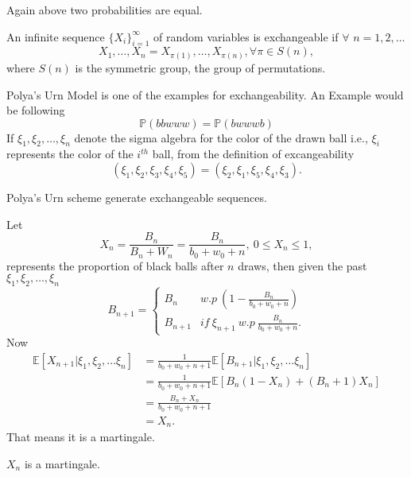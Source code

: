 \documentclass[a4paper,english,12pt]{article}
\begin{document}
Again above two probabilities are equal.
\begin{defn}
An infinite sequence $\{X_i\}_{i=1}^{\infty}$ of random variables is exchangeable if $\forall$ $n=1,2,\dots$
 \begin{equation*}
X_1,\dots,X_n=X_{\pi(1)},\dots ,X_{\pi(n)}, \forall \pi \in S(n),
\end{equation*}
where $S(n)$ is the symmetric group, the group of permutations.
\end{defn}
Polya's Urn Model is one of the examples for exchangeability. An Example would be following
 \begin{equation*}
\mathbb{P}(bbwww)=\mathbb{P}(bwwwb)
\end{equation*}
If $\xi_1,\xi_2,\dots,\xi_n$ denote the sigma algebra for the color of the drawn ball i.e., $\xi_i$ represents the color of the $i^{th}$ ball, from the definition of excangeability
\begin{equation*}
(\xi_1,\xi_2,\xi_3,\xi_4,\xi_5)=(\xi_2,\xi_1,\xi_5,\xi_4,\xi_3).
\end{equation*}
\begin{note}
Polya's Urn scheme generate exchangeable sequences.
\end{note}
Let 
\begin{equation*}
X_n=\frac{B_n}{B_n+W_n}=\frac{B_n}{b_0+w_0+n},\ 0\leq X_n \leq1,
\end{equation*}
represents the proportion of black balls after $n$ draws, then given the past $\xi_1,\xi_2,\dots,\xi_n$
\begin{equation*}
B_{n+1} =
\left\{
	\begin{array}{ll}
		B_n  & w.p \ (1-\frac{B_n}{b_0+w_0+n}) \\
		B_{n+1} & if \ \xi_{n+1} \ w.p \ \frac{B_n}{b_0+w_0+n}.
	\end{array}
\right.
\end{equation*}
Now
\begin{align*}
\mathbb{E}[X_{n+1}|\xi_1,\xi_2,\dots\xi_n]&=\frac{1}{b_0+w_0+n+1}\mathbb{E}[B_{n+1}|\xi_1,\xi_2,\dots\xi_n]\\
								&=\frac{1}{b_0+w_0+n+1}\mathbb{E}[B_n(1-X_n)+(B_n+1)X_n]\\
								&=\frac{B_n+X_n}{b_0+w_0+n+1}\\
								&=X_n.
\end{align*}
That means it is a martingale.
\begin{note}
$X_n$ is a martingale.
\end{note}
\end{document}
